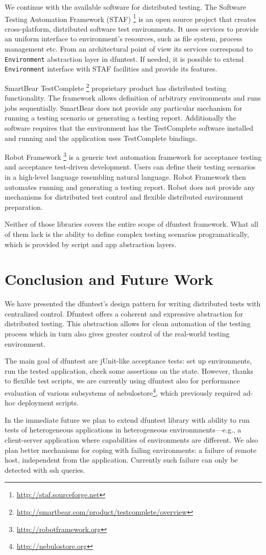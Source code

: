 We continue with the available software for distributed testing.
The Software Testing Automation Framework (STAF) \footnote{\url{http://staf.sourceforge.net}} is an open source
project that creates cross-platform, distributed software test environments. It
uses services to provide an uniform interface to environment's resources, such
as file system, process management etc. From an architectural point of view its
services correspond to \texttt{Environment} abstraction layer in dfuntest.
If needed, it is possible to extend \texttt{Environment} interface with STAF facilities and provide its features.

SmartBear TestComplete \footnote{\url{http://smartbear.com/product/testcomplete/overview}} proprietary product has distributed testing functionality.
The framework allows definition of arbitrary environments and runs jobs sequentially.
SmartBear does not provide any particular mechanism for running a testing scenario or generating a testing report.
Additionally the software requires that the environment has the TestComplete software installed and running and the application uses TestComplete bindings.

Robot Framework \footnote{\url{http://robotframework.org}} is a generic test automation framework for acceptance testing and acceptance test-driven development.
Users can define their testing scenarios in a high-level language resembling natural language.
Robot Framework then automates running and generating a testing report.
Robot does not provide any mechanisms for distributed test control and flexible distributed environment preparation.

Neither of those libraries covers the entire scope of dfuntest framework. What
all of them lack is the ability to define complex testing scenarios
programatically, which is provided by script and app abstraction layers.

\section{Conclusion and Future Work}

We have presented the dfuntest's design pattern for writing distributed tests with centralized control.
Dfuntest offers a coherent and expressive abstraction for distributed testing.
This abstraction allows for clean automation of the testing process which in turn also gives greater control of the real-world testing environment.

The main goal of dfuntest are jUnit-like acceptance tests: set up environments,
run the tested application, check some assertions on the state. However, thanks
to flexible test scripts, we are currently using dfuntest also for performance
evaluation of various subsystems of
nebulostore\footnote{\url{http://nebulostore.org}}, which previously required ad-hoc deployment scripts.

In the immediate future we plan to extend dfuntest library with ability to run tests of heterogeneous applications in heterogeneous environmnents---e.g., a client-server application where capabilities of environments are different.
We also plan better mechanisms for coping with failing environments: a failure of remote host, independent from the application. Currently such failure can only be detected with ssh queries.
